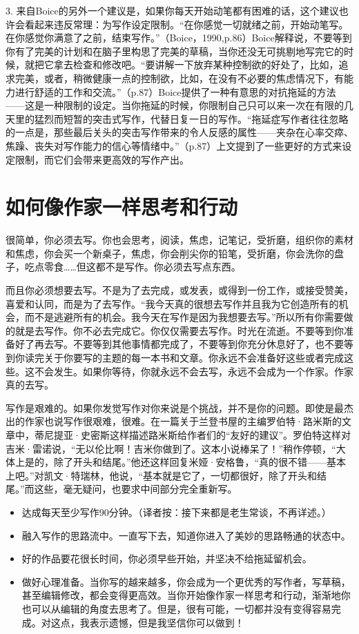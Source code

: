 \documentclass{ctexart}
\begin{document}
3. 来自Boice的另外一个建议是，如果你每天开始动笔都有困难的话，这个建议也许会看起来违反常理：为写作设定限制。“在你感觉一切就绪之前，开始动笔写。在你感觉你满意了之前，结束写作。”（Boice，1990,p.86）Boice解释说，不要等到你有了完美的计划和在脑子里构思了完美的草稿，当你还没无可挑剔地写完它的时候，就把它拿去检查和修改吧。“要讲解一下放弃某种控制欲的好处了，比如，追求完美，或者，稍微健康一点的控制欲，比如，在没有不必要的焦虑情况下，有能力进行舒适的工作和交流。”（p.87）Boice提供了一种有意思的对抗拖延的方法——这是一种限制的设定。当你拖延的时候，你限制自己只可以来一次在有限的几天里的猛烈而短暂的突击式写作，代替日复一日的写作。“拖延症写作者往往忽略的一点是，那些最后关头的突击写作带来的令人反感的属性——夹杂在心率交瘁、焦躁、丧失对写作能力的信心等情绪中。”（p.87）上文提到了一些更好的方式来设定限制，而它们会带来更高效的写作产出。

\section{如何像作家一样思考和行动}
很简单，你必须去写。你也会思考，阅读，焦虑，记笔记，受折磨，组织你的素材和焦虑，你会买一个新桌子，焦虑，你会削尖你的铅笔，受折磨，你会洗你的盘子，吃点零食……但这都不是写作。你必须去写点东西。

而且你必须想要去写。不是为了去完成，或发表，或得到一份工作，或接受赞美，喜爱和认同，而是为了去写作。“我今天真的很想去写作并且我为它创造所有的机会，而不是逃避所有的机会。我今天在写作是因为我想要去写。”所以所有你需要做的就是去写作。你不必去完成它。你仅仅需要去写作。时光在流逝。不要等到你准备好了再去写。不要等到其他事情都完成了，不要等到你充分休息好了，也不要等到你读完关于你要写的主题的每一本书和文章。你永远不会准备好这些或者完成这些。这不会发生。如果你等待，你就永远不会去写，永远不会成为一个作家。作家真的去写。

写作是艰难的。如果你发觉写作对你来说是个挑战，并不是你的问题。即使是最杰出的作家也说写作很艰难，很难。在一篇关于兰登书屋的主编罗伯特·路米斯的文章中，蒂尼提亚·史密斯这样描述路米斯给作者们的“友好的建议”。罗伯特这样对吉米·雷诺说，“无以伦比啊！吉米你做到了。这本小说棒呆了！”稍作停顿，“大体上是的，除了开头和结尾。”他还这样回复米娅·安格鲁，“真的很不错——基本上吧。”对凯文·特瑞林，他说，“基本就是它了，一切都很好，除了开头和结尾。”而这些，毫无疑问，也要求中间部分完全重新写。

\begin{itemize}
\item 达成每天至少写作90分钟。（译者按：接下来都是老生常谈，不再详述。）
\item 融入写作的思路流中。一直写下去，知道你进入了美妙的思路畅通的状态中。
\item 好的作品要花很长时间，你必须早些开始，并坚决不给拖延留机会。
\item 做好心理准备。当你写的越来越多，你会成为一个更优秀的写作者，写草稿，甚至编辑修改，都会变得更高效。当你开始像作家一样思考和行动，渐渐地你也可以从编辑的角度去思考了。但是，很有可能，一切都并没有变得容易完成。对这点，我表示遗憾，但是我坚信你可以做到！
\end{itemize}
\end{document}
